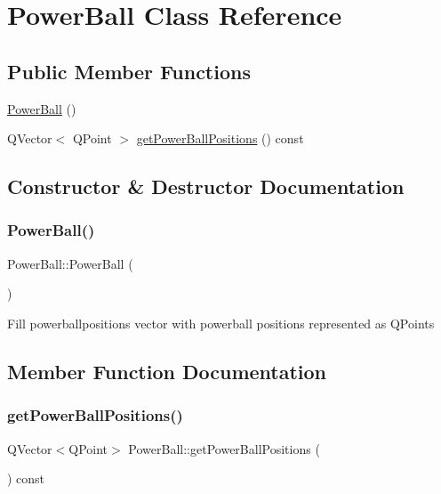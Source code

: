 \hypertarget{class_power_ball}{}\section{Power\+Ball Class Reference}
\label{class_power_ball}
\subsection*{Public Member Functions}
\begin{DoxyCompactItemize}
\item 
\mbox{\hyperlink{class_power_ball_a302335590af74067ed44079a4b475760}{Power\+Ball}} ()
\item 
Q\+Vector$<$ Q\+Point $>$ \mbox{\hyperlink{class_power_ball_a5782a4381cdbc5cecace7e420892622a}{get\+Power\+Ball\+Positions}} () const
\end{DoxyCompactItemize}


\subsection{Constructor \& Destructor Documentation}
\mbox{\label{class_power_ball_a302335590af74067ed44079a4b475760}} 
\subsubsection{\texorpdfstring{Power\+Ball()}{PowerBall()}}
{\footnotesize\ttfamily Power\+Ball\+::\+Power\+Ball (\begin{DoxyParamCaption}{ }\end{DoxyParamCaption})}

Fill powerballpositions vector with powerball positions represented as Q\+Points 

\subsection{Member Function Documentation}
\mbox{\label{class_power_ball_a5782a4381cdbc5cecace7e420892622a}} 
\subsubsection{\texorpdfstring{get\+Power\+Ball\+Positions()}{getPowerBallPositions()}}
{\footnotesize\ttfamily Q\+Vector$<$Q\+Point$>$ Power\+Ball\+::get\+Power\+Ball\+Positions (\begin{DoxyParamCaption}{ }\end{DoxyParamCaption}) const\hspace{0.3cm}{\ttfamily [inline]}}

